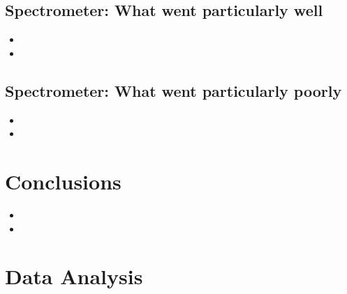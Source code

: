 \vspace{.2cm}


\subsection{Spectrometer: {\color{blue} What went particularly well}}

\begin{itemize}
\item{}
\item{}
\end{itemize}

\subsection{Spectrometer: {\color{red} What went particularly poorly}}

\begin{itemize}
\item{}
\item{}
\end{itemize}


\section{Conclusions}

\begin{itemize}
\item{}
\item{}
\end{itemize}


\newpage

\section{Data Analysis}

